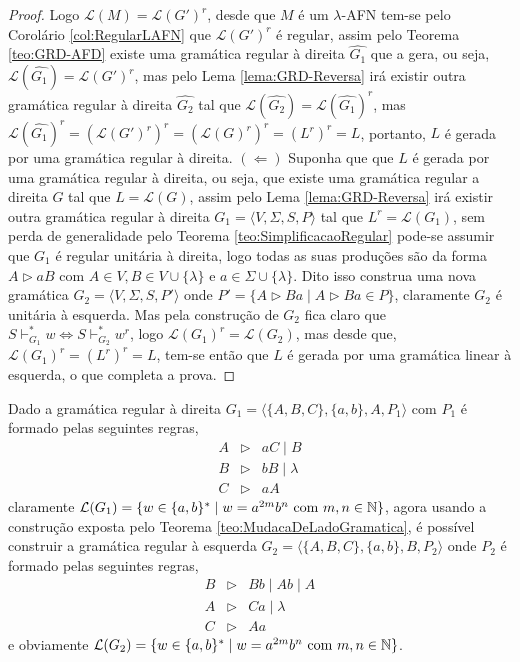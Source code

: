 \begin{proof}
	Logo $\mathcal{L}(M) = \mathcal{L}(G')^r$, desde que $M$ é um $\lambda$-AFN tem-se pelo Corolário \ref{col:RegularLAFN} que $\mathcal{L}(G')^r$ é regular, assim pelo Teorema \ref{teo:GRD-AFD} existe uma gramática regular à direita $\hat{G_1}$ que a gera, ou seja, $\mathcal{L}(\hat{G_1}) = \mathcal{L}(G')^r$, mas pelo Lema \ref{lema:GRD-Reversa} irá existir outra gramática regular à direita $\hat{G_2}$ tal que $\mathcal{L}(\hat{G_2}) = \mathcal{L}(\hat{G_1})^r$, mas $ \mathcal{L}(\hat{G_1})^r = (\mathcal{L}(G')^r)^r = (\mathcal{L}(G)^r)^r = (L^r)^r = L$, portanto, $L$ é gerada por uma gramática regular à direita. $(\Leftarrow)$ Suponha que que $L$ é gerada por uma gramática regular à direita, ou seja, que existe uma gramática regular a direita $G$ tal que $L = \mathcal{L}(G)$, assim pelo Lema \ref{lema:GRD-Reversa} irá existir outra gramática regular à direita $G_1 = \langle V, \Sigma, S, P \rangle$ tal que $L^r = \mathcal{L}(G_1)$, sem perda de generalidade pelo Teorema \ref{teo:SimplificacaoRegular} pode-se assumir que $G_1$ é regular unitária à direita, logo todas as suas produções são da forma $A \rhd aB$ com $A \in V, B \in V \cup \{\lambda\}$ e $a \in \Sigma \cup \{\lambda\}$. Dito isso construa uma nova gramática $G_2 = \langle V, \Sigma, S, P'\rangle$ onde $P' = \{A \rhd Ba \mid A \rhd Ba \in P\}$, claramente $G_2$ é unitária à esquerda. Mas pela construção de $G_2$ fica claro que $S \vdash_{G_1}^* w \Longleftrightarrow S \vdash_{G_2}^* w^r$, logo $\mathcal{L}(G_1)^r = \mathcal{L}(G_2)$, mas desde que, $\mathcal{L}(G_1)^r = (L^r)^r = L$, tem-se então que $L$ é gerada por uma gramática linear à esquerda, o que completa  a prova.
\end{proof}

\begin{example}
	Dado a gramática regular à direita $G_1 = \langle \{A, B, C\}, \{a, b\}, A, P_1 \rangle$ com $P_1$ é formado pelas seguintes regras,
	\begin{eqnarray*}
		A & \rhd & aC \mid B \\
		B & \rhd & bB \mid \lambda\\
		C & \rhd & aA
	\end{eqnarray*}
	claramente $\mathcal{L}(G_1) = \{w \in \{a, b\}^* \mid w = a^{2m}b^n \hbox{ com } m,n \in \mathbb{N}\}$,  agora usando a construção exposta pelo Teorema \ref{teo:MudacaDeLadoGramatica}, é possível construir a gramática regular à esquerda $G_2 = \langle \{A, B, C\}, \{a, b\}, B, P_2 \rangle$ onde $P_2$ é formado pelas seguintes regras,
	\begin{eqnarray*}
		B & \rhd & Bb \mid Ab \mid A\\
		A & \rhd & Ca \mid \lambda\\
		C & \rhd & Aa 
	\end{eqnarray*}
	e obviamente $\mathcal{L}(G_2) = \{w \in \{a, b\}^* \mid w = a^{2m}b^n \hbox{ com } m,n \in \mathbb{N}\}$.
\end{example}


